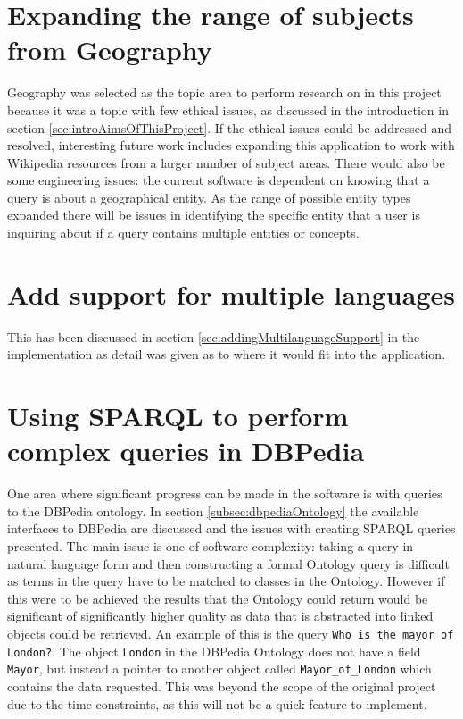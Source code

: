 \documentclass[authoryearcitations]{UoYCSproject}
\begin{document}
\section{Expanding the range of subjects from Geography}
\label{sec:evalExpandingSubjects}
Geography was selected as the topic area to perform research on in this project because it was a topic with few ethical issues, as discussed in the introduction in section \ref{sec:introAimsOfThisProject}. If the ethical issues could be addressed and resolved, interesting future work includes expanding this application to work with Wikipedia resources from a larger number of subject areas. There would also be some engineering issues: the current software is dependent on knowing that a query is about a geographical entity. As the range of possible entity types expanded there will be issues in identifying the specific entity that a user is inquiring about if a query contains multiple entities or concepts.

\section{Add support for multiple languages}
\label{sec:evalMultipleLanguages}
This has been discussed in section \ref{sec:addingMultilanguageSupport} in the implementation as detail was given as to where it would fit into the application. 

\section{Using SPARQL to perform complex queries in DBPedia}
\label{sec:evalSparql}
One area where significant progress can be made in the software is with queries to the DBPedia ontology. In section \ref{subsec:dbpediaOntology} the available interfaces to DBPedia are discussed and the issues with creating SPARQL queries presented. The main issue is one of software complexity: taking a query in natural language form and then constructing a formal Ontology query is difficult as terms in the query have to be matched to classes in the Ontology. However if this were to be achieved the results that the Ontology could return would be significant of significantly higher quality as data that is abstracted into linked objects could be retrieved. An example of this is the query \texttt{Who is the mayor of London?}. The object \texttt{London} in the DBPedia Ontology does not have a field \texttt{Mayor}, but instead a pointer to another object called \texttt{Mayor\_of\_London} which contains the data requested. This was beyond the scope of the original project due to the time constraints, as this will not be a quick feature to implement.
\end{document}
